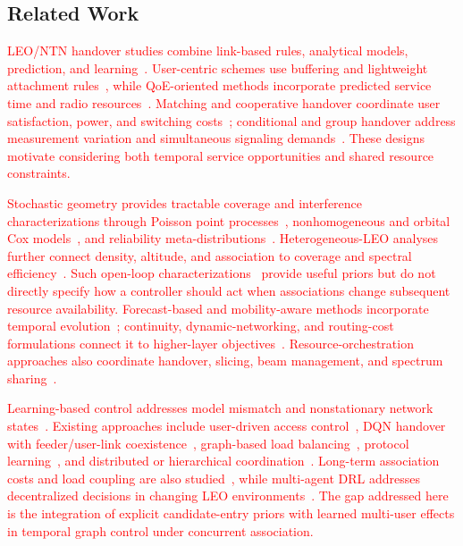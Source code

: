 \documentclass[10pt,letterpaper,journal]{IEEEtran}
\newcommand{\revnew}[1]{\textcolor{red}{#1}}
\begin{document}
\subsection{Related Work}
\label{RelatedWork}
\revnew{LEO/NTN handover studies combine link-based rules, analytical models, prediction, and learning~\cite{10443403}. User-centric schemes use buffering and lightweight attachment rules~\cite{9134390}, while QoE-oriented methods incorporate predicted service time and radio resources~\cite{9112229}. Matching and cooperative handover coordinate user satisfaction, power, and switching costs~\cite{10884973,10750324}; conditional and group handover address measurement variation and simultaneous signaling demands~\cite{9771987,10622669,10946034}. These designs motivate considering both temporal service opportunities and shared resource constraints.}

\IEEEpubidadjcol
\revnew{Stochastic geometry provides tractable coverage and interference characterizations through Poisson point processes~\cite{okati2020_downlink,talgat2021_sg}, nonhomogeneous and orbital Cox models~\cite{9681887,choi2024_cox}, and reliability meta-distributions~\cite{10107750}. Heterogeneous-LEO analyses further connect density, altitude, and association to coverage and spectral efficiency~\cite{10533435}. Such open-loop characterizations~\cite{9566290} provide useful priors but do not directly specify how a controller should act when associations change subsequent resource availability. Forecast-based and mobility-aware methods incorporate temporal evolution~\cite{li2020_forecast,hu2018_velocityaware}; continuity, dynamic-networking, and routing-cost formulations connect it to higher-layer objectives~\cite{wang2023_seamless,10002869,cheng2025_routingcost}. Resource-orchestration approaches also coordinate handover, slicing, beam management, and spectrum sharing~\cite{10738455,10795206}.}

\revnew{Learning-based control addresses model mismatch and nonstationary network states~\cite{10409745}. Existing approaches include user-driven access control~\cite{9273081}, DQN handover with feeder/user-link coexistence~\cite{11131136}, graph-based load balancing~\cite{LEE2025239}, protocol learning~\cite{lee2024_protocollearning}, and distributed or hierarchical coordination~\cite{10478861,10751771}. Long-term association costs and load coupling are also studied~\cite{9789983,9210807}, while multi-agent DRL addresses decentralized decisions in changing LEO environments~\cite{10552913,10551688}. The gap addressed here is the integration of explicit candidate-entry priors with learned multi-user effects in temporal graph control under concurrent association.}
\end{document}
